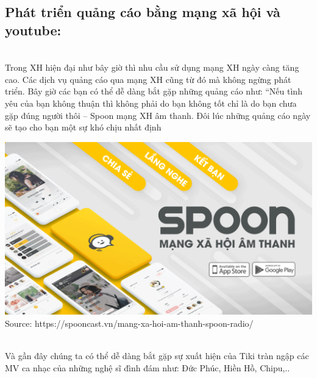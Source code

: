 \documentclass[13pt,a4paper]{article}
\begin{document}
    \subsection{Phát triển quảng cáo bằng mạng xã hội và youtube:}\\
    Trong XH hiện đại như bây giờ thì nhu cầu sử dụng mạng XH ngày càng tăng cao. Các dịch vụ quảng cáo qua mạng XH cũng từ đó mà không ngừng phát triển.
    Bây giờ các bạn có thể dễ dàng bắt gặp những quảng cáo như: “Nếu tình yêu của bạn không thuận thì không phải do bạn không tốt chỉ là do bạn chưa gặp đúng người thôi – Spoon mạng XH âm thanh. Đôi lúc những quảng cáo ngày sẽ tạo cho bạn một sự khó chịu nhất định
     \begin{center}
    \includegraphics[scale=0.25]{images/spoon.png} \\
    \fontsize{10pt}{1.2pt}\selectfont
    Source: https://spooncast.vn/mang-xa-hoi-am-thanh-spoon-radio/
    \end{center}\\
    Và gần đây chúng ta có thể dễ dàng bắt gặp sự xuất hiện của Tiki tràn ngập các MV ca nhạc của những nghệ sĩ đình đám như: Đức Phúc, Hiền Hồ, Chipu,..
\end{document}
